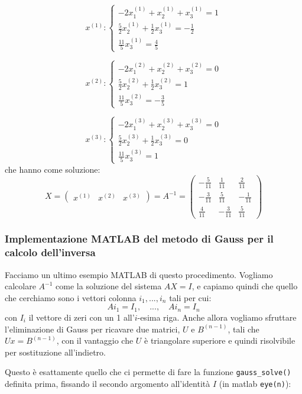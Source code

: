 \documentclass[a4paper,11pt]{article}
\begin{document}
\begin{minipage}{0.35\textwidth}

	\[
	x^{(1)} :
		\begin{cases}
			-2 x_1^{(1)} + x_2^{(1)} + x_3^{(1)} = 1 \\ 
			\frac{5}{2} x_2^{(1)} + \frac{1}{2} x_3^{(1)} = -\frac{1}{2} \\ 
			\frac{11}{5} x_3^{(1)} = \frac{4}{5}
		\end{cases}
	\]

\end{minipage}%
\hfill
\begin{minipage}{0.35\textwidth}

	\[
	x^{(2)} :
		\begin{cases}
			-2 x_1^{(2)} + x_2^{(2)} + x_3^{(2)} = 0 \\ 
			\frac{5}{2} x_2^{(2)} + \frac{1}{2} x_3^{(2)} = 1 \\ 
			\frac{11}{5} x_3^{(2)} = -\frac{3}{5}
		\end{cases}
	\]

\end{minipage}
\[
x^{(3)} :
	\begin{cases}
		-2 x_1^{(3)} + x_2^{(3)} + x_3^{(3)} = 0 \\ 
		\frac{5}{2} x_2^{(3)} + \frac{1}{2} x_3^{(3)} = 0 \\ 
		\frac{11}{5} x_3^{(3)} = 1
	\end{cases}
\]
che hanno come soluzione:
$$
X = \begin{pmatrix}
	x^{(1)} & x^{(2)} & x^{(3)}
\end{pmatrix} = A^{-1} = \begin{pmatrix}
	-\frac{5}{11} & \frac{1}{11} & \frac{2}{11} \\ 
	-\frac{3}{11} & \frac{5}{11} & -\frac{1}{11} \\ 
	\frac{4}{11} & -\frac{3}{11} & \frac{5}{11}
\end{pmatrix}
$$

\subsubsection{Implementazione MATLAB del metodo di Gauss per il calcolo dell'inversa}
Facciamo un ultimo esempio MATLAB di questo procedimento.
Vogliamo calcolare $A^{-1}$ come la soluzione del sistema $AX = I$, e capiamo quindi che quello che cerchiamo sono i vettori colonna $i_1, ..., i_n$ tali per cui:
$$
A i_1 = I_1, \quad ..., \quad A i_n = I_n
$$
	con $I_i$ il vettore di zeri con un 1 all'$i$-esima riga. 
	Anche allora vogliamo sfruttare l'eliminazione di Gauss per ricavare due matrici, $U$ e $B^{(n - 1)}$, tali che $Ux = B^{(n - 1)}$, con il vantaggio che $U$ è triangolare superiore e quindi risolvibile per sostituzione all'indietro.

	Questo è esattamente quello che ci permette di fare la funzione \lstinline|gauss_solve()| definita prima, fissando il secondo argomento all'identità $I$ (in matlab \lstinline|eye(n)|):
	
\end{document}
